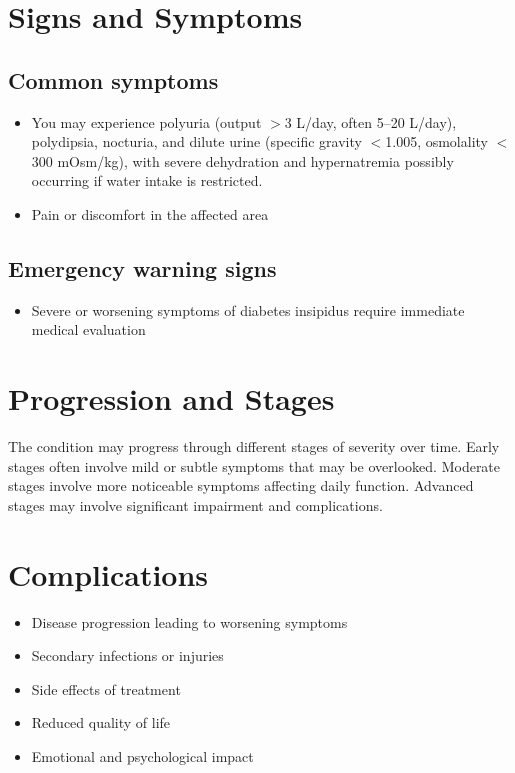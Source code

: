 \section{Signs and Symptoms}

\subsection{Common symptoms}
\begin{itemize}[noitemsep]
  \item You may experience polyuria (output $>$3 L/day, often 5--20 L/day), polydipsia, nocturia, and dilute urine (specific gravity $<$1.005, osmolality $<$300 mOsm/kg), with severe dehydration and hypernatremia possibly occurring if water intake is restricted.

  \item Pain or discomfort in the affected area
  \end{itemize}

\subsection{Emergency warning signs}
\begin{itemize}[noitemsep]
  \item Severe or worsening symptoms of diabetes insipidus require immediate medical evaluation
\end{itemize}
\section{Progression and Stages}
The condition may progress through different stages of severity over time. Early stages often involve mild or subtle symptoms that may be overlooked. Moderate stages involve more noticeable symptoms affecting daily function. Advanced stages may involve significant impairment and complications.
\section{Complications}
\begin{itemize}[noitemsep]
  \item Disease progression leading to worsening symptoms
  \item Secondary infections or injuries
  \item Side effects of treatment
  \item Reduced quality of life
  \item Emotional and psychological impact
\end{itemize}
